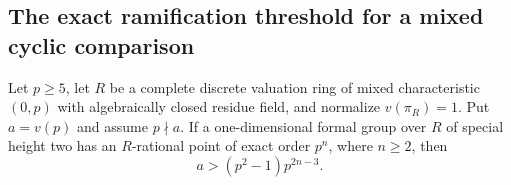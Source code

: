 \subsection{The exact ramification threshold for a mixed cyclic comparison}

\begin{lemma}
\label{lem:B-RD63-point}
Let $p\ge5$, let $R$ be a complete discrete valuation ring of mixed
characteristic $(0,p)$ with algebraically closed residue field, and
normalize $v(\pi_R)=1$. Put $a=v(p)$ and assume $p\nmid a$.
If a one-dimensional formal group over $R$ of special height two
has an $R$-rational point of exact order $p^n$, where $n\ge2$, then
\[
                    a>(p^2-1)p^{2n-3}.                 \tag{B-RD63.1}
\]
\end{lemma}
